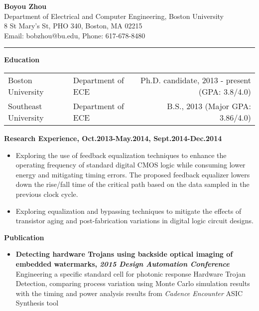 \documentclass[]{article}
\begin{document}
\pagestyle{empty}
\begin{center}
\vspace{-0.2in}
{\large\textbf{Boyou Zhou}}\\
Department of Electrical and Computer Engineering, Boston University\\
8 St Mary's St, PHO 340, Boston, MA 02215\\
Email: bobzhou@bu.edu, Phone: 617-678-8480\\
\rule[-0.1cm]{7.5in}{0.01cm}
\end{center}
%

\textbf{Education}
\vspace{-0.1in}
\begin{table*}[h]
  \begin{tabular}{p{2.0in}p{2.0in}r}
    Boston University& Department of ECE & Ph.D. candidate, 2013 - present
    (GPA: 3.8/4.0)\\ 
    Southeast University & Department of ECE & B.S., 2013
    (Major GPA: 3.86/4.0)\\ 
  \end{tabular}
  \label{tbl:1}
\end{table*}

\vspace{-0.1in}
\noindent \textbf{Research Experience, Oct.2013-May.2014, Sept.2014-Dec.2014}
		\begin{itemize}
            \item Exploring the use of feedback equalization techniques to
            enhance the operating frequency of standard digital CMOS logic
            while consuming lower energy and mitigating timing errors. The
            proposed feedback equalizer lowers down the rise/fall time of
            the critical path based on the data sampled in the previous
            clock cycle. 

            \item Exploring equalization and bypassing techniques to mitigate
            the effects of transistor aging and post-fabrication
            variations in digital logic circuit designs.
		
        \end{itemize}

\noindent \textbf{Publication}
\vspace{-0.15cm}
\begin{itemize}
    \item \textbf{Detecting hardware Trojans using backside optical imaging of
    embedded watermarks, \textit{2015 Design Automation Conference}} Engineering
    a specific standard cell for photonic response Hardware Trojan Detection,
    comparing process variation using Monte Carlo simulation results with the
    timing and power analysis results from \textit{Cadence Encounter} ASIC
    Synthesis tool
\end{itemize}
\end{document}
